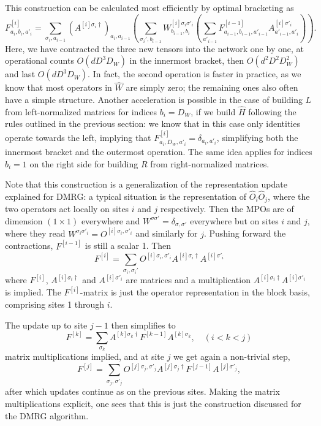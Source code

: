 This construction can be calculated most efficiently by optimal bracketing as 
\begin{equation}
F^{[i]}_{a_i,b_{i},a'_i} = \sum_{\sigma_i,a_{i-1}}
(A^{[i]\sigma_i\dagger})_{a_i,a_{i-1}} 
\left( \sum_{\sigma_i',b_{i-1}}
W^{[i]\sigma_i\sigma'_i}_{b_{i-1},b_{i}}
\left( \sum_{a'_{i-1}} F^{[i-1]}_{a_{i-1},b_{i-1},a'_{i-1}} A^{[i]\sigma'_i}_{a'_{i-1},a'_i}  \right) \right) .
\end{equation}
Here, we have contracted the three new tensors into the network one by one, at operational counts $O(dD^3 D_W)$ in the innermost bracket, then $O(d^2 D^2 D_W^2)$ and last $O(d D^3 D_W)$. In fact, the second operation is faster in practice, as we know that most operators in $\hat{W}$ are simply zero; the remaining ones also often have a simple structure. Another acceleration is possible in the case of building $L$ from left-normalized matrices for indices $b_i=D_W$, if we build $\hat{H}$ following the rules outlined in the previous section: we know that in this case only identities operate towards the left, implying that $F^{[i]}_{a_i,D_W,a'_i} = \delta_{a_i,a'_i}$, simplifying both the innermost bracket and the outermost operation. The same idea applies for indices $b_i=1$ on the right side for building $R$ from right-normalized matrices.

Note that this construction is a generalization of the representation update explained for DMRG: a typical situation is the representation of $\hat{O}_i \hat{O}_j$, where the two operators act locally on sites $i$ and $j$ respectively. Then the MPOs are of dimension $(1\times 1)$ everywhere and $W^{\sigma\sigma'} = \delta_{\sigma,\sigma'}$ everywhere but on sites $i$ and $j$, where they read $W^{\sigma_i\sigma'_i} = O^{[i]\sigma_i,\sigma'_i}$ and similarly for $j$. Pushing forward the contractions, $F^{[i-1]}$ is still a scalar 1. Then
\begin{equation}
F^{[i]} =  \sum_{\sigma_i,\sigma_i'} O^{[i]\sigma_i,\sigma'_i} A^{[i]\sigma_i\dagger} A^{[i]\sigma'_i}
\end{equation}
where $F^{[i]}$, $A^{[i]\sigma_i\dagger}$ and $A^{[i]\sigma'_i}$ are matrices and a multiplication $A^{[i]\sigma_i\dagger} A^{[i]\sigma'_i}$ is implied. The $F^{[i]}$-matrix is just the operator representation in the block basis, comprising sites 1 through $i$. 

The update up to site $j-1$ then simplifies to
\begin{equation}
F^{[k]} =  \sum_{\sigma_k} A^{[k]\sigma_k\dagger} F^{[k-1]} A^{[k]\sigma_k} ,\quad (i<k<j)
\end{equation}
matrix multiplications implied, and at site $j$ we get again a non-trivial step,
\begin{equation}
F^{[j]} = \sum_{\sigma_j,\sigma'_j} O^{[j]\sigma_j,\sigma'_j} A^{[j]\sigma_j\dagger} F^{[j-1]} A^{[j]\sigma'_j},
\end{equation}
after which updates continue as on the previous sites. Making the matrix multiplications explicit, one sees that this is just the construction discussed for the DMRG algorithm.
  
